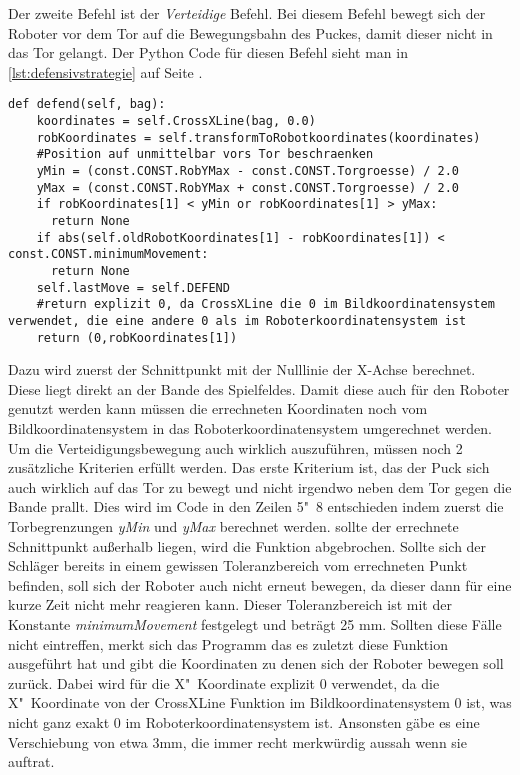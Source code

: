 Der zweite Befehl ist der \textit{Verteidige} Befehl. Bei diesem Befehl bewegt sich der Roboter vor dem Tor auf die Bewegungsbahn des Puckes, damit dieser nicht in das Tor gelangt. Der Python Code für diesen Befehl sieht man in \ref{lst:defensivstrategie} auf Seite \pageref{lst:defensivstrategie}.
\begin{lstlisting}[caption= python-funktion für Defensivstrategie, label=lst:defensivstrategie]
def defend(self, bag):
	koordinates = self.CrossXLine(bag, 0.0)
	robKoordinates = self.transformToRobotkoordinates(koordinates)
	#Position auf unmittelbar vors Tor beschraenken
	yMin = (const.CONST.RobYMax - const.CONST.Torgroesse) / 2.0
	yMax = (const.CONST.RobYMax + const.CONST.Torgroesse) / 2.0
	if robKoordinates[1] < yMin or robKoordinates[1] > yMax:
	  return None
	if abs(self.oldRobotKoordinates[1] - robKoordinates[1]) < const.CONST.minimumMovement:
	  return None
	self.lastMove = self.DEFEND
	#return explizit 0, da CrossXLine die 0 im Bildkoordinatensystem verwendet, die eine andere 0 als im Roboterkoordinatensystem ist
	return (0,robKoordinates[1])
\end{lstlisting}
Dazu wird zuerst der Schnittpunkt mit der Nulllinie der X-Achse berechnet. Diese liegt direkt an der Bande des Spielfeldes. Damit diese auch für den Roboter genutzt werden kann müssen die errechneten Koordinaten noch vom Bildkoordinatensystem in das Roboterkoordinatensystem umgerechnet werden. Um die Verteidigungsbewegung auch wirklich auszuführen, müssen noch 2 zusätzliche Kriterien erfüllt werden. Das erste Kriterium ist, das der Puck sich auch wirklich auf das Tor zu bewegt und nicht irgendwo neben dem Tor gegen die Bande prallt. Dies wird im Code in den Zeilen 5"~8 entschieden indem zuerst die Torbegrenzungen  \textit{yMin} und \textit{yMax} berechnet werden. sollte der errechnete Schnittpunkt außerhalb liegen, wird die Funktion abgebrochen. Sollte sich der Schläger bereits in einem gewissen Toleranzbereich vom errechneten Punkt befinden, soll sich der Roboter auch nicht erneut bewegen, da dieser dann für eine kurze Zeit nicht mehr reagieren kann. Dieser Toleranzbereich ist mit der Konstante \textit{minimumMovement} festgelegt und beträgt 25 mm. Sollten diese Fälle nicht eintreffen, merkt sich das Programm das es zuletzt diese Funktion ausgeführt hat und gibt die Koordinaten zu denen sich der Roboter bewegen soll zurück. Dabei wird für die X"~Koordinate explizit 0 verwendet, da die X"~Koordinate von der CrossXLine Funktion im Bildkoordinatensystem 0 ist, was nicht ganz exakt 0 im Roboterkoordinatensystem ist. Ansonsten gäbe es eine Verschiebung von etwa 3mm, die immer recht merkwürdig aussah wenn sie auftrat.


